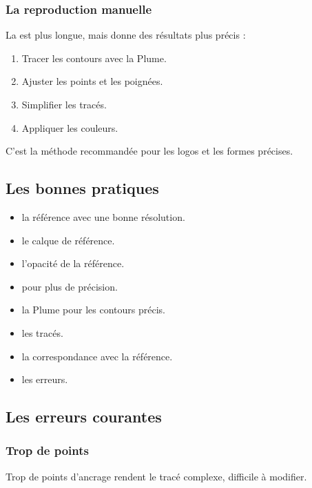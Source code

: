 \subsubsection{La reproduction manuelle}

La  est plus longue, mais donne des résultats plus précis :

\begin{enumerate}
    \item Tracer les contours avec la Plume.
    \item Ajuster les points et les poignées.
    \item Simplifier les tracés.
    \item Appliquer les couleurs.
\end{enumerate}

C'est la méthode recommandée pour les logos et les formes précises.

\subsection{Les bonnes pratiques}

\begin{itemize}
    \item {} la référence avec une bonne résolution.
    \item {} le calque de référence.
    \item {} l'opacité de la référence.
    \item {} pour plus de précision.
    \item {} la Plume pour les contours précis.
    \item {} les tracés.
    \item {} la correspondance avec la référence.
    \item {} les erreurs.
\end{itemize}

\subsection{Les erreurs courantes}

\subsubsection{Trop de points}

Trop de points d'ancrage rendent le tracé complexe, difficile à modifier.

